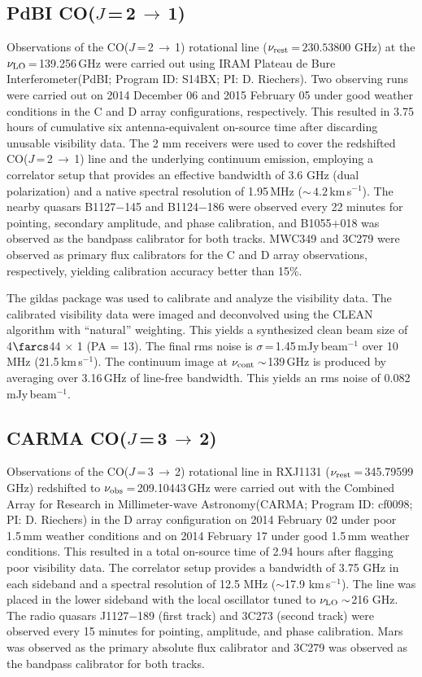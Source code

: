 \documentclass[]{emulateapj}
\newcommand{\rarr}{$\rightarrow$}
\newcommand{\bco}{\mbox{CO($J$\,=\,2\,\rarr\,1)}\xspace}
\newcommand{\cco}{\mbox{CO($J$\,=\,3\,\rarr\,2)}\xspace}
\newcommand{\kms}{\mbox{km\,s$^{-1}$}\xspace}
\newcommand{\pmOne}{\mbox{$^{-1}$}\xspace}
\newcommand{\eq}{\,=\,}
\def\pdbi     {Plateau de Bure Interferometer\xspace}
\def\carma    {Combined Array for Research in Millimeter-wave Astronomy\xspace}
\newcommand{\ncode}[1]{{\sc #1}}
\begin{document}
\subsection{PdBI \bco}
Observations of the \bco rotational line
($\nu_{\rm rest}$\,=\,$230.53800$ GHz)
at the $\nu_{\rm LO}$\eq139.256\,GHz
were carried out using IRAM \pdbi (PdBI; Program ID: S14BX; PI: D.
Riechers). Two observing runs were carried out on 2014 December 06 and 2015
February 05 under good weather conditions in the C and D array configurations,
respectively.
This resulted in 3.75 hours of cumulative six antenna-equivalent on-source
time after discarding unusable visibility data.
The 2 mm receivers were used to cover the redshifted \bco line
and the underlying continuum emission, employing a correlator setup that provides
an effective bandwidth of 3.6 GHz (dual polarization) and a native spectral resolution of 1.95\,MHz
($\sim$\,$4.2$\,\kms).
The nearby quasars B1127$-$145 and B1124$-$186 were observed every 22 minutes
for pointing, secondary amplitude, and phase calibration, and B1055$+$018 was
observed as the bandpass calibrator for both tracks.
MWC349 and 3C279 were observed as primary flux calibrators for the C and D
array observations, respectively, yielding calibration accuracy better than 15\%.

The \ncode{gildas} package was used to calibrate and analyze the visibility data.
The calibrated visibility data were imaged and deconvolved using the CLEAN algorithm with ``natural''
weighting. This yields a synthesized clean beam size of 4$\farcs$44 $\times$ 1 (PA = 13\degr).
The final rms noise is $\sigma$\,=\,1.45\,mJy\,beam\pmOne
over 10 MHz (21.5\,\kms). The continuum image at $\nu_{\rm cont}\sim$139\,GHz
is produced by averaging over 3.16\,GHz of line-free bandwidth. This
yields an rms noise of 0.082 mJy\,beam$^{-1}$.

\subsection{CARMA \cco}
Observations of the \cco rotational line in RXJ1131
($\nu_{\rm rest}$\,=\,345.79599\,GHz) redshifted to $\nu_{\rm obs}$\eq209.10443\,GHz
were carried out with the \carma (CARMA;
Program ID: cf0098; PI: D. Riechers)
in the D array configuration on 2014 February 02 under poor 1.5\,mm
weather conditions and on 2014 February 17 under good 1.5\,mm
weather conditions.
This resulted in a total on-source time of 2.94 hours after flagging poor
visibility data.
The correlator setup provides a bandwidth of 3.75 GHz in
each sideband and a
spectral resolution of 12.5 MHz ($\sim$17.9 \kms). The
line was placed in the lower sideband with the local oscillator tuned to $\nu_{\rm LO}\sim$216 GHz. The radio quasars J1127$-$189 (first track) and 3C273
(second track) were observed
every 15 minutes for pointing, amplitude, and phase calibration. Mars was
observed as the primary absolute flux calibrator and 3C279 was observed as
the bandpass calibrator for both tracks.
\end{document}
